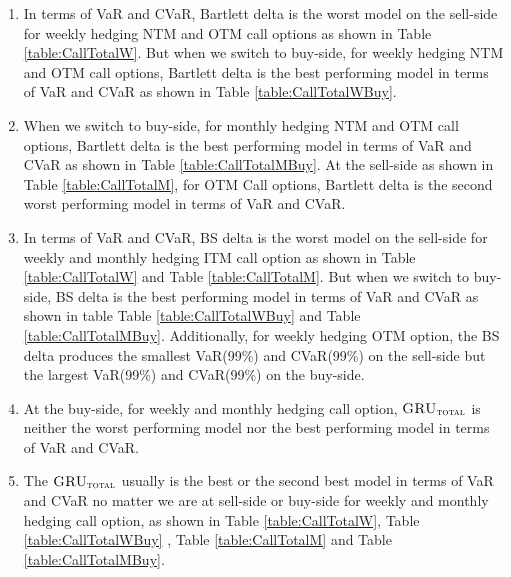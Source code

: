 \documentclass[letterpaper,12pt,titlepage,oneside,final]{book}
\numberwithin{equation}{section}
\theoremstyle{definition}
\newcommand{\modelT}{\textsc{GRU}_{\textsc{total}}}
\begin{document}
\begin{enumerate}
	\item In terms of VaR and CVaR, Bartlett delta is the worst model on the sell-side for weekly  hedging NTM and OTM call options as shown in Table \ref{table:CallTotalW}. But when we  switch to buy-side, for weekly hedging NTM and OTM call options, Bartlett delta is the best performing  model in terms of VaR and CVaR as shown in Table \ref{table:CallTotalWBuy}.
	
	\item  When we  switch to buy-side, for monthly hedging NTM and OTM call options, Bartlett delta is the best performing  model in terms of VaR and CVaR as shown in Table \ref{table:CallTotalMBuy}. At the sell-side as shown in  Table \ref{table:CallTotalM}, for OTM Call options, Bartlett delta is the second worst performing model in terms of VaR and CVaR.
	
	\item In terms of VaR and CVaR, BS delta is the worst model on the sell-side for weekly  and monthly hedging ITM call option as shown in Table \ref{table:CallTotalW} and Table \ref{table:CallTotalM}. But when we switch to buy-side,   BS delta is the best performing  model in terms of VaR and CVaR as shown in table  Table \ref{table:CallTotalWBuy} and Table \ref{table:CallTotalMBuy}. Additionally, for weekly hedging OTM option, the BS delta produces the smallest VaR(99\%) and CVaR(99\%) on the sell-side but the largest VaR(99\%) and CVaR(99\%) on the buy-side.
	\item At the buy-side, for weekly and monthly hedging call option, $\modelT$  is neither the worst performing model nor the best performing model in terms of VaR and CVaR. 
	\item The $\modelT$ usually is the best or the second best model in terms of VaR and CVaR no matter we are at sell-side or buy-side for weekly and monthly hedging call option,  as shown in Table \ref{table:CallTotalW}, Table \ref{table:CallTotalWBuy} , Table \ref{table:CallTotalM} and Table \ref{table:CallTotalMBuy}.
\end{enumerate}
\end{document}
